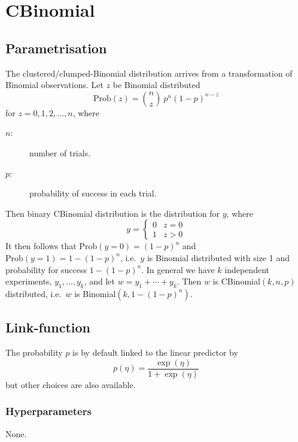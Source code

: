 \documentclass[a4paper,11pt]{article}
\begin{document}
\section*{CBinomial}

\subsection*{Parametrisation}

The clustered/clumped-Binomial distribution arrives from a
transformation of Binomial observations. Let $z$ be Binomial
distributed
\begin{displaymath}
    \text{Prob}(z) = {n \choose z} \ p^n (1-p)^{n-z}
\end{displaymath}
for $z=0, 1, 2, \ldots,n$, where
\begin{description}
\item[$n$:] number of trials.
\item[$p$:] probability of success in each trial.
\end{description}
Then binary CBinomial distribution is the distribution for $y$, where
\begin{displaymath}
    y =
    \begin{cases}
        0 & z = 0\\
        1 & \text{$z > 0$}
    \end{cases}
\end{displaymath}
It then follows that $\text{Prob}(y = 0) = (1-p)^{n}$ and
$\text{Prob}(y=1) = 1-(1-p)^{n}$, i.e.\ $y$ is Binomial distributed
with size 1 and probability for success $1-(1-p)^{n}$. In general we
have $k$ independent experiments, $y_{1}, \ldots, y_{k}$, and let $w =
y_{1}+ \cdots + y_{k}$. Then $w$ is CBinomial$(k,n,p)$ distributed,
i.e.\ $w$ is Binomial$(k, 1-(1-p)^{n})$.

\subsection*{Link-function}

The probability $p$ is by default linked to the linear predictor by
\begin{displaymath}
    p(\eta) = \frac{\exp(\eta)}{1+\exp(\eta)}
\end{displaymath}
but other choices are also available.

\subsubsection*{Hyperparameters}
None.
\end{document}
